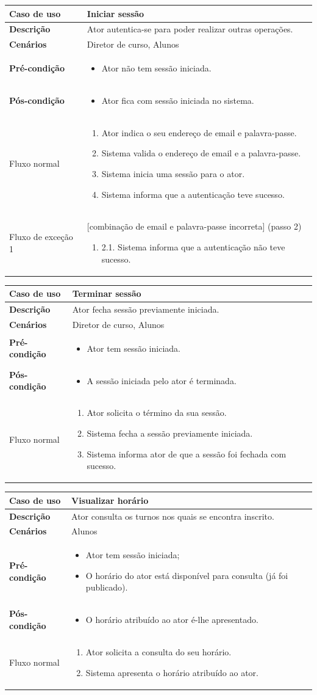 \documentclass[12pt, a4paper]{article}
\newenvironment{condition}{
    \begin{itemize}[wide=0pt]
        \vspace{-0.2cm}
}{
        \vspace{-0.5cm}
    \end{itemize}
}
\newcommand\flow[1]{
    Fluxo normal &
    \singlespacing
    \begin{enumerate}[wide=0pt]
        #1
        \vspace{-0.3cm}
    \end{enumerate} \\ \hline
}
\newcommand\otherflow[3]{
    #1 &
    #2
    \singlespacing
    \begin{enumerate}[wide=0pt]
        #3
        \vspace{-0.3cm}
    \end{enumerate} \\ \hline
}
\newenvironment{usecase}[5]{
    \begin{table}[H]
        \centering
        \begin{tabular}{|>{\centering\arraybackslash\bf}m{3cm}|m{13cm}|}
            \hline
            Caso de uso & \textbf{#1} \\

            \hline
            Descrição & #2 \\

            \hline
            Cenários & #3 \\

            \hline
            Pré-condição &
            \begin{condition}
                #4
            \end{condition} \\

            \hline
            Pós-condição &
            \begin{condition}
                #5
            \end{condition} \\

            \hline
}{
    \end{tabular}
\end{table}
}
\begin{document}
\begin{usecase}
    {Iniciar sessão}
    {Ator autentica-se para poder realizar outras operações.}
    {Diretor de curso, Alunos}
    {\item Ator não tem sessão iniciada.}
    {\item Ator fica com sessão iniciada no sistema.}

    \flow{
        \item Ator indica o seu endereço de email e palavra-passe.
        \item Sistema valida o endereço de email e a palavra-passe.
        \item Sistema inicia uma sessão para o ator.
        \item Sistema informa que a autenticação teve sucesso.
    }

    \otherflow{Fluxo de exceção 1}{[combinação de email e palavra-passe incorreta] (passo 2)}{
        \item[2.1.] Sistema informa que a autenticação não teve sucesso.
    }
\end{usecase}

\begin{usecase}
    {Terminar sessão}
    {Ator fecha sessão previamente iniciada.}
    {Diretor de curso, Alunos}
    {\item Ator tem sessão iniciada.}
    {\item A sessão iniciada pelo ator é terminada.}

    \flow{
        \item Ator solicita o término da sua sessão.
        \item Sistema fecha a sessão previamente iniciada.
        \item Sistema informa ator de que a sessão foi fechada com sucesso.
    }
\end{usecase}

\begin{usecase}
    {Visualizar horário}
    {Ator consulta os turnos nos quais se encontra inscrito.}
    {Alunos}
    {
        \item Ator tem sessão iniciada;
        \item O horário do ator está disponível para consulta (já foi publicado).
    }
    {\item O horário atribuído ao ator é-lhe apresentado.}

    \flow{
        \item Ator solicita a consulta do seu horário.
        \item Sistema apresenta o horário atribuído ao ator.
    }
\end{usecase}
\end{document}
